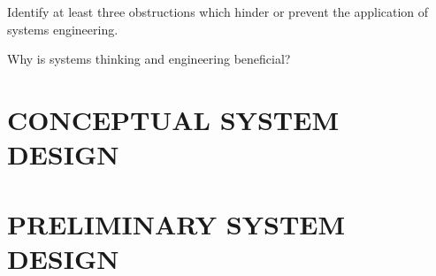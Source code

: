 \begin{exercises}
    \begin{exercise}
    \label{sea-2-23}
        Identify at least three obstructions which hinder or prevent the application of systems engineering.
    \end{exercise}
    \begin{solution}
    \end{solution}
    
    \begin{exercise}
    \label{sea-2-24}
        Why is systems thinking and engineering beneficial?
    \end{exercise}
    \begin{solution}
    \end{solution}

\end{exercises}


\chapter{CONCEPTUAL SYSTEM DESIGN}

\begin{exercises}
    \begin{exercise}
    \label{sea-3-1}
    
    \end{exercise}
    \begin{solution}
    \end{solution}

\end{exercises}


\chapter{PRELIMINARY SYSTEM DESIGN}

\begin{exercises}
    \begin{exercise}
    \label{sea-4-1}
    
    \end{exercise}
    \begin{solution}
    \end{solution}

\end{exercises}

